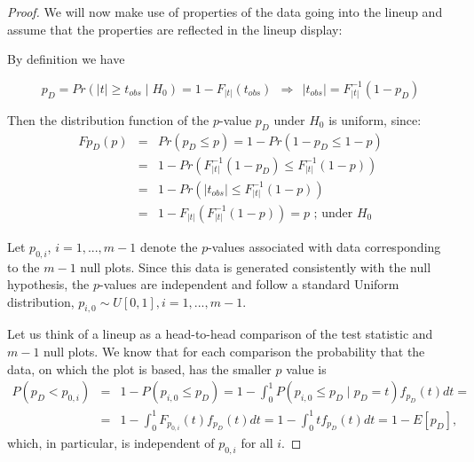 \documentclass{article}
\begin{document}
\begin{proof}
We will now make use of properties of the data going into the lineup and assume that the properties are reflected in the lineup display:

 By definition we have 

$$p_D=Pr\left(|t| \ge t_{obs} \mid H_0\right)=1-F_{|t|}(t_{obs}) \ \ \Rightarrow \ \  |t_{obs}|=F_{|t|}^{-1}(1-p_D)$$

Then the distribution function of the $p$-value $p_D$ under $H_0$ is uniform, since:  
\begin{eqnarray}\label{dist_p}
F{p_D}(p) &=& Pr(p_D \le p)=1-Pr(1-p_D \le 1-p) \nonumber \\
  &=& 1-Pr\left(F_{|t|}^{-1}(1-p_D) \le F_{|t|}^{-1}(1-p) \right) \nonumber \\
  &=& 1-Pr\left(|t_{obs}| \le F_{|t|}^{-1}(1-p)\right) \nonumber \\
  &=&%
          1-F_{|t|}\left( F_{|t|}^{-1}(1-p)\right)=p \mbox{ ; under $H_0$} 
\end{eqnarray}




Let $p_{0,i}$, $i=1, ..., m-1$ denote the  $p$-values associated with data corresponding to the $m-1$ null plots. Since this data is generated consistently with the null hypothesis,  the $p$-values are independent and  follow a standard Uniform distribution, $p_{i,0} \sim U[0,1], i= 1, ..., m-1$.

Let us think of a lineup as a head-to-head comparison of the test statistic and $m-1$ null plots. 
We know that for each comparison the probability that the data, on which the plot is based, has the smaller $p$ value is 
\begin{eqnarray*}
P(p_D < p_{0,i}) &=& 1 - P(p_{i,0} \le p_D) = 1- \int_0^1  P(p_{i,0} \le p_D \mid p_D=t) f_{p_D}(t) dt =  \\
&=& 1 - \int_0^1 F_{p_{0,i}}(t) f_{p_D}(t) dt = 1 - \int_0^1 t f_{p_D}(t) dt = 1 - E[p_D],
\end{eqnarray*}
which, in particular, is independent of $p_{0,i}$ for all $i$.


\end{proof}
\end{document}
